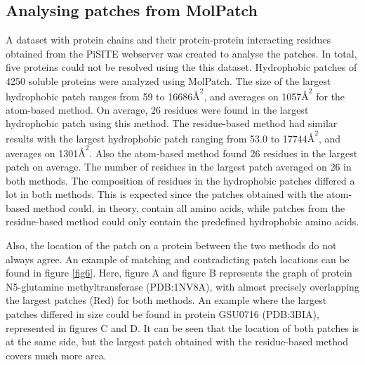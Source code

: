 \documentclass[11pt,a4paper]{article}
\begin{document}
\subsection{Analysing patches from MolPatch}
A dataset with protein chains and their protein-protein interacting residues obtained from the PiSITE webserver was created to analyse the patches. In total, five proteins could not be resolved using the this dataset. Hydrophobic patches of 4250 soluble proteins were analyzed using MolPatch. The size of the largest hydrophobic patch ranges from 59 to 16686$\si{\angstrom}^2$, and averages on 1057$\si{\angstrom}^2$ for the atom-based method. On average, 26 residues were found in the largest hydrophobic patch using this method. The residue-based method had similar results with the largest hydrophobic patch ranging from 53.0 to 17744$\si{\angstrom}^2$, and averages on 1301$\si{\angstrom}^2$. Also the atom-based method found 26 residues in the largest patch on average. The number of residues in the largest patch averaged on 26 in both methods. The composition of residues in the hydrophobic patches differed a lot in both methods. This is expected since the patches obtained with the atom-based method could, in theory, contain all amino acids, while patches from the residue-based method could only contain the predefined hydrophobic amino acids. 

Also, the location of the patch on a protein between the two methods do not always agree. An example of matching and contradicting patch locations can be found in figure \ref{fig6}. Here, figure A and figure B represents the graph of protein N5-glutamine methyltransferase (PDB:1NV8A), with almost precisely overlapping the largest patches (Red) for both methods. An example where the largest patches differed in size could be found in protein GSU0716 (PDB:3BIA), represented in figures C and D. It can be seen that the location of both patches is at the same side, but the largest patch obtained with the residue-based method covers much more area.
\end{document}
